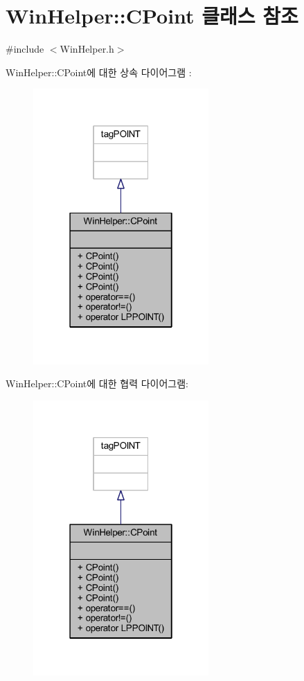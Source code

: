 \hypertarget{class_win_helper_1_1_c_point}{}\section{Win\+Helper\+:\+:C\+Point 클래스 참조}
\label{class_win_helper_1_1_c_point}


{\ttfamily \#include $<$Win\+Helper.\+h$>$}



Win\+Helper\+:\+:C\+Point에 대한 상속 다이어그램 \+: \nopagebreak
\begin{figure}[H]
\begin{center}
\leavevmode
\includegraphics[width=190pt]{class_win_helper_1_1_c_point__inherit__graph}
\end{center}
\end{figure}


Win\+Helper\+:\+:C\+Point에 대한 협력 다이어그램\+:\nopagebreak
\begin{figure}[H]
\begin{center}
\leavevmode
\includegraphics[width=190pt]{class_win_helper_1_1_c_point__coll__graph}
\end{center}
\end{figure}
